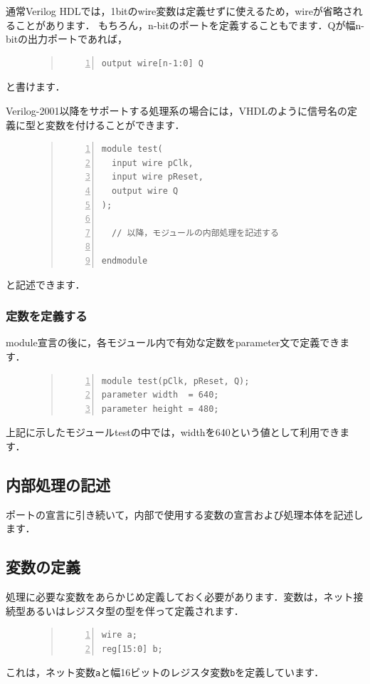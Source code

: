 \documentclass[a4paper,dvipdfmx]{jsarticle}
\begin{document}
通常Verilog HDLでは，1bitのwire変数は定義せずに使えるため，wireが省略されることがあります．
もちろん，n-bitのポートを定義することもでます．Qが幅n-bitの出力ポートであれば，
\begin{figure}[H]
\begin{quote}
\begin{Verbatim}[frame=single, numbers=left, baselinestretch=0.8]
output wire[n-1:0] Q
\end{Verbatim}
\end{quote}
\end{figure}
と書けます．

Verilog-2001以降をサポートする処理系の場合には，VHDLのように信号名の定義に型と変数を付けることができます．
\begin{figure}[H]
\begin{quote}
\begin{Verbatim}[frame=single, numbers=left, baselinestretch=0.8]
module test(
  input wire pClk, 
  input wire pReset,
  output wire Q
);

  // 以降，モジュールの内部処理を記述する

endmodule
\end{Verbatim}
\end{quote}
\end{figure}
と記述できます．

\subsubsection{定数を定義する}
module宣言の後に，各モジュール内で有効な定数をparameter文で定義できます．
\begin{figure}[H]
\begin{quote}
\begin{Verbatim}[frame=single, numbers=left, baselinestretch=0.8]
module test(pClk, pReset, Q);
parameter width  = 640;
parameter height = 480;
\end{Verbatim}
\end{quote}
\end{figure}
上記に示したモジュールtestの中では，widthを640という値として利用できます．

\subsection{内部処理の記述}
ポートの宣言に引き続いて，内部で使用する変数の宣言および処理本体を記述します．

\subsection{変数の定義}
処理に必要な変数をあらかじめ定義しておく必要があります．変数は，ネット接続型あるいはレジスタ型の型を伴って定義されます．
\begin{figure}[H]
\begin{quote}
\begin{Verbatim}[frame=single, numbers=left, baselinestretch=0.8]
wire a;
reg[15:0] b;
\end{Verbatim}
\end{quote}
\end{figure}
これは，ネット変数\verb|a|と幅16ビットのレジスタ変数\verb|b|を定義しています．
\end{document}
